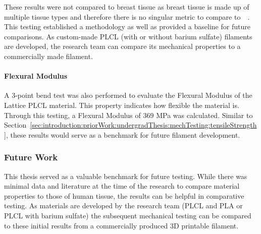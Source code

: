 These results were not compared to breast tissue as breast tissue is made up of multiple tissue types and therefore there is no singular metric to compare to~\cite{RefWorks:RefID:36-american2021breast}~\cite{RefWorks:RefID:370-einsteinisaac}. This testing established a methodology as well as provided a baseline for future comparisons. As custom-made PLCL (with or without barium sulfate) filaments are developed, the research team can compare its mechanical properties to a commercially made filament.

\paragraph*{Flexural Modulus\label{sec:introduction:priorWork:undergradThesis:mechTesting:flexuralModulus}}

A 3-point bend test was also performed to evaluate the Flexural Modulus of the Lattice PLCL material. This property indicates how flexible the material is. Through this testing, a Flexural Modulus of 369 MPa was calculated. Similar to Section~\ref{sec:introduction:priorWork:undergradThesis:mechTesting:tensileStrength}, these results would serve as a benchmark for future filament development.

\subsubsection{Future Work\label{sec:introduction:priorWork:undergradThesis:futureWork}}

This thesis served as a valuable benchmark for future testing. While there was minimal data and literature at the time of the research to compare material properties to those of human tissue, the results can be helpful in comparative testing. As materials are developed by the research team (PLCL and PLA or PLCL with barium sulfate) the subsequent mechanical testing can be compared to these initial results from a commercially produced 3D printable filament.
